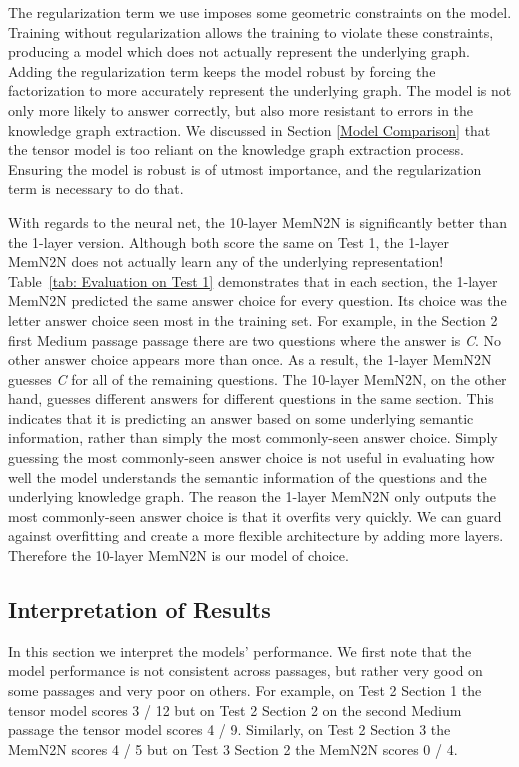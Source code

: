 \documentclass[pageno]{final_paper}
\begin{document}
The regularization term we use imposes some geometric constraints on the model.
Training without regularization allows the training to violate these
constraints, producing a model which does not actually represent the underlying
graph. Adding the regularization term keeps the model robust by forcing the
factorization to more accurately represent the underlying graph. The model is
not only more likely to answer correctly, but also more resistant to errors in
the knowledge graph extraction. We discussed in Section \ref{Model Comparison}
that the tensor model is too reliant on the knowledge graph extraction process.
Ensuring the model is robust is of utmost importance, and the regularization
term is necessary to do that.

With regards to the neural net, the 10-layer MemN2N is significantly better than
the 1-layer version. Although both score the same on Test 1, the 1-layer MemN2N
does not actually learn any of the underlying representation! Table~\ref{tab:
Evaluation on Test 1} demonstrates that in each section, the 1-layer MemN2N
predicted the same answer choice for every question. Its choice was the letter
answer choice seen most in the training set. For example, in the Section 2 first
Medium passage passage there are two questions where the answer is \textit{C}.
No other answer choice appears more than once. As a result, the 1-layer MemN2N
guesses \textit{C} for all of the remaining questions. The 10-layer MemN2N, on
the other hand, guesses different answers for different questions in the same
section. This indicates that it is predicting an answer based on some underlying
semantic information, rather than simply the most commonly-seen answer choice.
Simply guessing the most commonly-seen answer choice is not useful in evaluating
how well the model understands the semantic information of the questions and the
underlying knowledge graph. The reason the 1-layer MemN2N only outputs the most
commonly-seen answer choice is that it overfits very quickly. We can guard
against overfitting and create a more flexible architecture by adding more
layers. Therefore the 10-layer MemN2N is our model of choice.

\subsection{Interpretation of Results}
\label{Interpretation of Results}

In this section we interpret the models' performance. We first note that the
model performance is not consistent across passages, but rather very good on
some passages and very poor on others. For example, on Test 2 Section 1 the
tensor model scores 3 / 12 but on Test 2 Section 2 on the second Medium passage
the tensor model scores 4 / 9. Similarly, on Test 2 Section 3 the MemN2N scores
4 / 5 but on Test 3 Section 2 the MemN2N scores 0 / 4. \\
\end{document}
